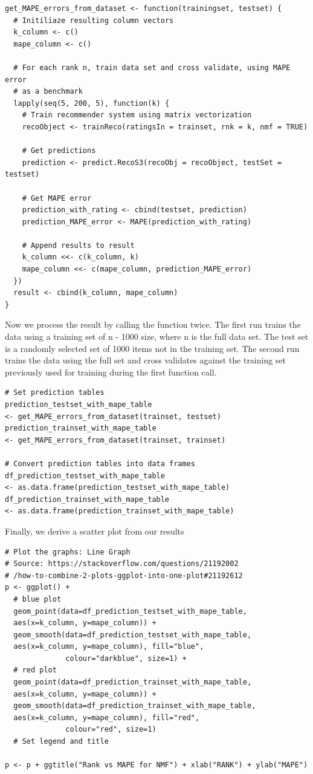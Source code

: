 \documentclass{article}
\begin{document}
\begin{verbatim}
get_MAPE_errors_from_dataset <- function(trainingset, testset) {
  # Initiliaze resulting column vectors
  k_column <- c()
  mape_column <- c()
  
  # For each rank n, train data set and cross validate, using MAPE error 
  # as a benchmark
  lapply(seq(5, 200, 5), function(k) {
    # Train recommender system using matrix vectorization
    recoObject <- trainReco(ratingsIn = trainset, rnk = k, nmf = TRUE)
    
    # Get predictions
    prediction <- predict.RecoS3(recoObj = recoObject, testSet = testset)
    
    # Get MAPE error
    prediction_with_rating <- cbind(testset, prediction)
    prediction_MAPE_error <- MAPE(prediction_with_rating)
    
    # Append results to result
    k_column <<- c(k_column, k)
    mape_column <<- c(mape_column, prediction_MAPE_error)
  })
  result <- cbind(k_column, mape_column)
}

\end{verbatim}

Now we process the result by calling the function twice. The first run trains the data using a training set of n - 1000 size, where n is the full data set. The test set is a randomly selected set of 1000 items not in the training set. The second run trains the data using the full set and cross validates against the training set previously used for training during the first function call.

\begin{verbatim}
# Set prediction tables
prediction_testset_with_mape_table 
<- get_MAPE_errors_from_dataset(trainset, testset)
prediction_trainset_with_mape_table 
<- get_MAPE_errors_from_dataset(trainset, trainset)

# Convert prediction tables into data frames
df_prediction_testset_with_mape_table
<- as.data.frame(prediction_testset_with_mape_table)
df_prediction_trainset_with_mape_table 
<- as.data.frame(prediction_trainset_with_mape_table)

\end{verbatim}

Finally, we derive a scatter plot from our results

\begin{verbatim}
# Plot the graphs: Line Graph
# Source: https://stackoverflow.com/questions/21192002
# /how-to-combine-2-plots-ggplot-into-one-plot#21192612
p <- ggplot() +
  # blue plot
  geom_point(data=df_prediction_testset_with_mape_table, 
  aes(x=k_column, y=mape_column)) + 
  geom_smooth(data=df_prediction_testset_with_mape_table, 
  aes(x=k_column, y=mape_column), fill="blue",
              colour="darkblue", size=1) +
  # red plot
  geom_point(data=df_prediction_trainset_with_mape_table, 
  aes(x=k_column, y=mape_column)) + 
  geom_smooth(data=df_prediction_trainset_with_mape_table, 
  aes(x=k_column, y=mape_column), fill="red",
              colour="red", size=1)
  # Set legend and title

p <- p + ggtitle("Rank vs MAPE for NMF") + xlab("RANK") + ylab("MAPE")

\end{verbatim}
\end{document}

